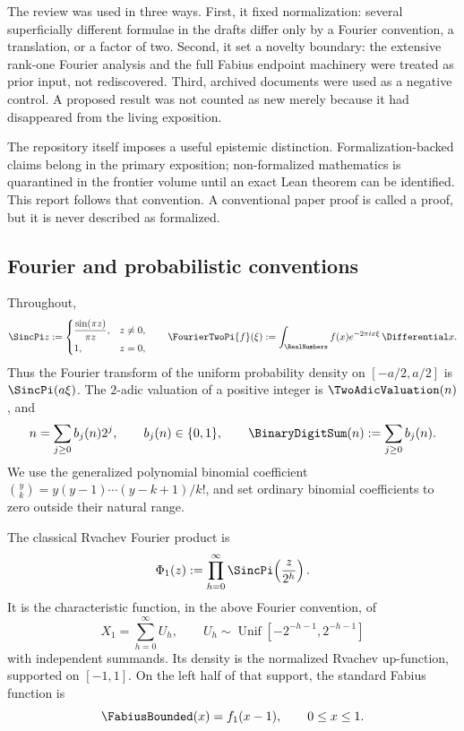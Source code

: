 \documentclass[11pt,oneside]{article}
\theoremstyle{definition}
\theoremstyle{remark}
\begin{document}
The review was used in three ways.  First, it fixed normalization: several superficially different formulae in the drafts differ only by a Fourier convention, a translation, or a factor of two.  Second, it set a novelty boundary: the extensive rank-one Fourier analysis and the full Fabius endpoint machinery were treated as prior input, not rediscovered.  Third, archived documents were used as a negative control.  A proposed result was not counted as new merely because it had disappeared from the living exposition.

The repository itself imposes a useful epistemic distinction.  Formalization-backed claims belong in the primary exposition; non-formalized mathematics is quarantined in the frontier volume until an exact Lean theorem can be identified.  This report follows that convention.  A conventional paper proof is called a proof, but it is never described as formalized.

\subsection{Fourier and probabilistic conventions}

Throughout,
\[
  \SincPi z:=\begin{cases}
  \dfrac{\sin(\pi z)}{\pi z},&z\ne0,\\[0.4em]
  1,&z=0,
  \end{cases}
  \qquad
  \FourierTwoPi{f}(\xi):=\int_{\RealNumbers}f(x)e^{-2\pi i x\xi}\,\Differential x.
\]
Thus the Fourier transform of the uniform probability density on $[-a/2,a/2]$ is $\SincPi(a\xi)$.  The $2$-adic valuation of a positive integer is $\TwoAdicValuation(n)$, and
\[
  n=\sum_{j\ge0}b_j(n)2^j,
  \qquad b_j(n)\in\{0,1\},
  \qquad \BinaryDigitSum(n):=\sum_{j\ge0}b_j(n).
\]
We use the generalized polynomial binomial coefficient $\binom yk=y(y-1)\cdots(y-k+1)/k!$, and set ordinary binomial coefficients to zero outside their natural range.

The classical Rvachev Fourier product is
\begin{equation}\label{p3:eq:phi1}
  \Phi_1(z):=\prod_{h=0}^{\infty}\SincPi\!\left(\frac z{2^h}\right).
\end{equation}
It is the characteristic function, in the above Fourier convention, of
\begin{equation}\label{p3:eq:X1}
  X_1=\sum_{h=0}^{\infty}U_h,
  \qquad U_h\sim\operatorname{Unif}\!\left[-2^{-h-1},2^{-h-1}\right]
\end{equation}
with independent summands.  Its density is the normalized Rvachev up-function, supported on $[-1,1]$.  On the left half of that support, the standard Fabius function is
\begin{equation}\label{p3:eq:fabius-shift}
  \FabiusBounded(x)=f_1(x-1),\qquad 0\le x\le1.
\end{equation}
\end{document}
